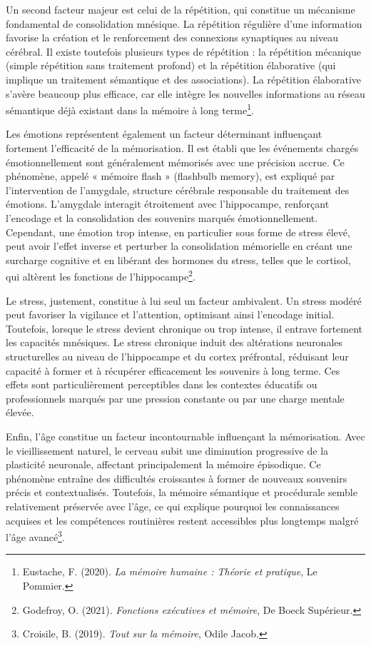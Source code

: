 \documentclass[12pt,a4paper]{report}
\begin{document}
Un second facteur majeur est celui de la répétition, qui constitue un mécanisme fondamental de consolidation mnésique. La répétition régulière d’une information favorise la création et le renforcement des connexions synaptiques au niveau cérébral. Il existe toutefois plusieurs types de répétition : la répétition mécanique (simple répétition sans traitement profond) et la répétition élaborative (qui implique un traitement sémantique et des associations). La répétition élaborative s’avère beaucoup plus efficace, car elle intègre les nouvelles informations au réseau sémantique déjà existant dans la mémoire à long terme\footnote{Eustache, F. (2020). \textit{La mémoire humaine : Théorie et pratique}, Le Pommier.}.

Les émotions représentent également un facteur déterminant influençant fortement l’efficacité de la mémorisation. Il est établi que les événements chargés émotionnellement sont généralement mémorisés avec une précision accrue. Ce phénomène, appelé « mémoire flash » (flashbulb memory), est expliqué par l’intervention de l’amygdale, structure cérébrale responsable du traitement des émotions. L’amygdale interagit étroitement avec l’hippocampe, renforçant l’encodage et la consolidation des souvenirs marqués émotionnellement. Cependant, une émotion trop intense, en particulier sous forme de stress élevé, peut avoir l’effet inverse et perturber la consolidation mémorielle en créant une surcharge cognitive et en libérant des hormones du stress, telles que le cortisol, qui altèrent les fonctions de l’hippocampe\footnote{Godefroy, O. (2021). \textit{Fonctions exécutives et mémoire}, De Boeck Supérieur.}.

Le stress, justement, constitue à lui seul un facteur ambivalent. Un stress modéré peut favoriser la vigilance et l’attention, optimisant ainsi l’encodage initial. Toutefois, lorsque le stress devient chronique ou trop intense, il entrave fortement les capacités mnésiques. Le stress chronique induit des altérations neuronales structurelles au niveau de l’hippocampe et du cortex préfrontal, réduisant leur capacité à former et à récupérer efficacement les souvenirs à long terme. Ces effets sont particulièrement perceptibles dans les contextes éducatifs ou professionnels marqués par une pression constante ou par une charge mentale élevée.

Enfin, l’âge constitue un facteur incontournable influençant la mémorisation. Avec le vieillissement naturel, le cerveau subit une diminution progressive de la plasticité neuronale, affectant principalement la mémoire épisodique. Ce phénomène entraîne des difficultés croissantes à former de nouveaux souvenirs précis et contextualisés. Toutefois, la mémoire sémantique et procédurale semble relativement préservée avec l’âge, ce qui explique pourquoi les connaissances acquises et les compétences routinières restent accessibles plus longtemps malgré l’âge avancé\footnote{Croisile, B. (2019). \textit{Tout sur la mémoire}, Odile Jacob.}.
\end{document}
